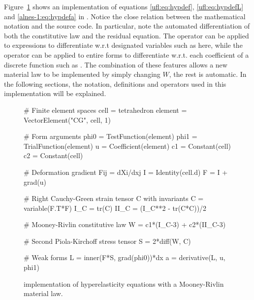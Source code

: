 Figure~\ref{ufl:fig:hypcode} shows an implementation of equations
\eqref{ufl:eq:hypdef}, \eqref{ufl:eq:hypdefL} and \eqref{alnes-1:eq:hypdefa}
in \ufl{}.  Notice the close relation between the mathematical notation
and the \ufl{} source code. In particular, note the automated
differentiation of both the constitutive law and the residual
equation. The operator  can be applied to expressions
to differentiate w.r.t designated variables such as  here,
while the operator  can be applied to entire forms
to differentiate w.r.t. each coefficient of a discrete function such
as .  The combination of these features allows a new material
law to be implemented by simply changing $W$, the rest is automatic.
In the following sections, the notation, definitions and operators used
in this implementation will be explained.

\begin{figure}\label{ufl:fig:hypcode}
\begin{uflcode}
# Finite element spaces
cell = tetrahedron
element = VectorElement("CG", cell, 1)

# Form arguments
phi0 = TestFunction(element)
phi1 = TrialFunction(element)
u = Coefficient(element)
c1 = Constant(cell)
c2 = Constant(cell)

# Deformation gradient Fij = dXi/dxj
I = Identity(cell.d)
F = I + grad(u)

# Right Cauchy-Green strain tensor C with invariants
C = variable(F.T*F)
I_C = tr(C)
II_C = (I_C**2 - tr(C*C))/2

# Mooney-Rivlin constitutive law
W = c1*(I_C-3) + c2*(II_C-3)

# Second Piola-Kirchoff stress tensor
S = 2*diff(W, C)

# Weak forms
L = inner(F*S, grad(phi0))*dx
a = derivative(L, u, phi1)
\end{uflcode}
\caption{\ufl{} implementation of hyperelasticity equations with a
Mooney-Rivlin material law.}
\end{figure}

